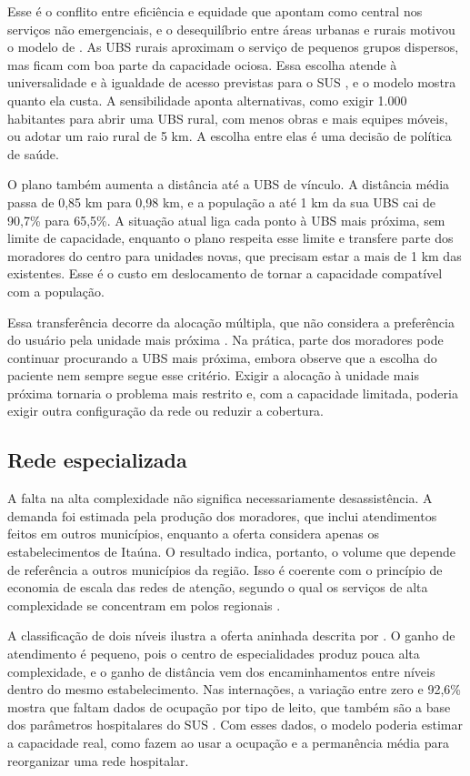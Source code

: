 \documentclass[12pt,a4paper,oneside]{report}
\begin{document}
Esse é o conflito entre eficiência e equidade que \citet{ahmadi2017} apontam como central nos serviços
não emergenciais, e o desequilíbrio entre áreas urbanas e rurais motivou o modelo de \citet{hodgson1988}.
As UBS rurais aproximam o serviço de pequenos grupos dispersos, mas ficam com boa parte da capacidade
ociosa. Essa escolha atende à universalidade e à igualdade de acesso previstas para o SUS
\citep{brasil1988cf,brasil1990}, e o modelo mostra quanto ela custa. A sensibilidade aponta alternativas,
como exigir 1.000 habitantes para abrir uma UBS rural, com menos obras e mais equipes móveis, ou adotar
um raio rural de 5 km. A escolha entre elas é uma decisão de política de saúde.

O plano também aumenta a distância até a UBS de vínculo. A distância média passa de 0,85 km para 0,98 km,
e a população a até 1 km da sua UBS cai de 90,7\% para 65,5\%. A situação atual liga cada ponto à UBS
mais próxima, sem limite de capacidade, enquanto o plano respeita esse limite e transfere parte dos
moradores do centro para unidades novas, que precisam estar a mais de 1 km das existentes. Esse é o custo
em deslocamento de tornar a capacidade compatível com a população.

Essa transferência decorre da alocação múltipla, que não considera a preferência do usuário pela unidade
mais próxima \citep{contreras2019}. Na prática, parte dos moradores pode continuar procurando a UBS mais
próxima, embora \citet{hodgson1988} observe que a escolha do paciente nem sempre segue esse critério.
Exigir a alocação à unidade mais próxima tornaria o problema mais restrito e, com a capacidade limitada,
poderia exigir outra configuração da rede ou reduzir a cobertura.

\subsection{Rede especializada}
A falta na alta complexidade não significa necessariamente desassistência. A demanda foi estimada pela
produção dos moradores, que inclui atendimentos feitos em outros municípios, enquanto a oferta considera
apenas os estabelecimentos de Itaúna. O resultado indica, portanto, o volume que depende de referência a
outros municípios da região. Isso é coerente com o princípio de economia de escala das redes de atenção,
segundo o qual os serviços de alta complexidade se concentram em polos regionais
\citep{brasil2010,mendes2010}.

A classificação de dois níveis ilustra a oferta aninhada descrita por \citet{sahin2007}. O ganho de
atendimento é pequeno, pois o centro de especialidades produz pouca alta complexidade, e o ganho de
distância vem dos encaminhamentos entre níveis dentro do mesmo estabelecimento. Nas internações, a
variação entre zero e 92,6\% mostra que faltam dados de ocupação por tipo de leito, que também são a
base dos parâmetros hospitalares do SUS \citep{brasil2015b}. Com esses dados, o modelo poderia estimar a
capacidade real, como fazem \citet{guerriero2016} ao usar a ocupação e a permanência média para
reorganizar uma rede hospitalar.
\end{document}

